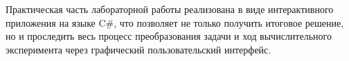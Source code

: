 Практическая часть лабораторной работы реализована в виде интерактивного приложения на языке C\#, что позволяет не только получить итоговое решение, но и проследить весь процесс преобразования задачи и ход вычислительного эксперимента через графический пользовательский интерфейс.










